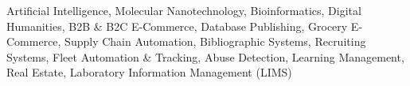 \begin{par}
  \small{
Artificial Intelligence,
Molecular Nanotechnology,
Bioinformatics,
Digital Humanities,
B2B \& B2C E-Commerce,
Database Publishing,
Grocery E-Commerce,
Supply Chain Automation,
Bibliographic Systems,
Recruiting Systems,
Fleet Automation \& Tracking,
Abuse Detection,
Learning Management,
Real Estate,
Laboratory Information Management (LIMS)}
\end{par}
